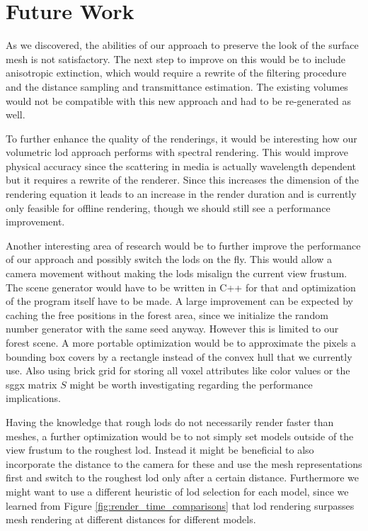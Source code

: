 \chapter{Future Work}
\label{chap:future_work}
As we discovered, the abilities of our approach to preserve the look of the surface mesh is not satisfactory.
The next step to improve on this would be to include anisotropic extinction, which would require a rewrite of the filtering procedure and the distance sampling and transmittance estimation.
The existing volumes would not be compatible with this new approach and had to be re-generated as well.

To further enhance the quality of the renderings, it would be interesting how our volumetric \ac{lod} approach performs with spectral rendering.
This would improve physical accuracy since the scattering in media is actually wavelength dependent \cite{novak_overview} but it requires a rewrite of the renderer.
Since this increases the dimension of the rendering equation it leads to an increase in the render duration and is currently only feasible for offline rendering, though we should still see a performance improvement.

Another interesting area of research would be to further improve the performance of our approach and possibly switch the \acsp{lod} on the fly.
This would allow a camera movement without making the \acsp{lod} misalign the current view frustum.
The scene generator would have to be written in C++ for that and optimization of the program itself have to be made.
A large improvement can be expected by caching the free positions in the forest area, since we initialize the random number generator with the same seed anyway.
However this is limited to our forest scene.
A more portable optimization would be to approximate the pixels a bounding box covers by a rectangle instead of the convex hull that we currently use.
Also using brick grid for storing all voxel attributes like color values or the \ac{sggx} matrix $S$ might be worth investigating regarding the performance implications.

Having the knowledge that rough \acsp{lod} do not necessarily render faster than meshes, a further optimization would be to not simply set models outside of the view frustum to the roughest \ac{lod}.
Instead it might be beneficial to also incorporate the distance to the camera for these and use the mesh representations first and switch to the roughest \ac{lod} only after a certain distance.
Furthermore we might want to use a different heuristic of \ac{lod} selection for each model, since we learned from Figure \ref{fig:render_time_comparisons} that \ac{lod} rendering surpasses mesh rendering at different distances for different models.